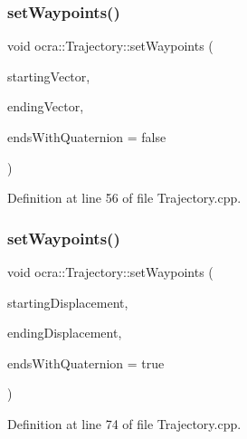 \hypertarget{classocra_1_1Trajectory_a941a5f6357d5ee707d703357eb525d6e}{}\label{classocra_1_1Trajectory_a941a5f6357d5ee707d703357eb525d6e} 
\subsubsection{\texorpdfstring{set\+Waypoints()}{setWaypoints()}\hspace{0.1cm}{\footnotesize\ttfamily [2/6]}}
{\footnotesize\ttfamily void ocra\+::\+Trajectory\+::set\+Waypoints (\begin{DoxyParamCaption}\item[{const Eigen\+::\+Vector\+Xd \&}]{starting\+Vector,  }\item[{const Eigen\+::\+Vector\+Xd \&}]{ending\+Vector,  }\item[{bool}]{ends\+With\+Quaternion = {\ttfamily false} }\end{DoxyParamCaption})}



Definition at line 56 of file Trajectory.\+cpp.

\hypertarget{classocra_1_1Trajectory_a8d9de492efb89ff6a05f66c2498fd5e6}{}\label{classocra_1_1Trajectory_a8d9de492efb89ff6a05f66c2498fd5e6} 
\subsubsection{\texorpdfstring{set\+Waypoints()}{setWaypoints()}\hspace{0.1cm}{\footnotesize\ttfamily [3/6]}}
{\footnotesize\ttfamily void ocra\+::\+Trajectory\+::set\+Waypoints (\begin{DoxyParamCaption}\item[{Eigen\+::\+Displacementd \&}]{starting\+Displacement,  }\item[{Eigen\+::\+Displacementd \&}]{ending\+Displacement,  }\item[{bool}]{ends\+With\+Quaternion = {\ttfamily true} }\end{DoxyParamCaption})}



Definition at line 74 of file Trajectory.\+cpp.

\hypertarget{classocra_1_1Trajectory_ad787da3056374594ce65df54795deae8}{}\label{classocra_1_1Trajectory_ad787da3056374594ce65df54795deae8} 
